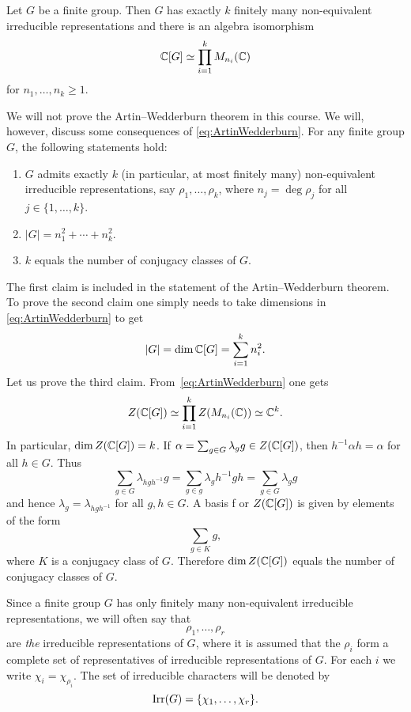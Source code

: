 \begin{theorem}
\label{thm:ArtinWedderburn}
Let $G$ be a finite group. Then $G$ has exactly $k$ finitely
many non-equivalent irreducible representations
and there is an algebra isomorphism 
\begin{equation}
    \label{eq:ArtinWedderburn}
    \mathbb{C}[G]\simeq \prod_{i=1}^k M_{n_i}(\mathbb{C})
\end{equation}
for $n_1,\dots,n_k\geq1$. 
\end{theorem}

We will not prove the Artin--Wedderburn theorem
in this course. We will, however, 
discuss some consequences of \eqref{eq:ArtinWedderburn}. For any finite group $G$, 
the following statements hold: 
\begin{enumerate}
    \item $G$ admits exactly $k$ (in particular, at most finitely many) 
    non-equivalent
    irreducible representations, say $\rho_1,\dots,\rho_k$, where 
    $n_j=\deg\rho_j$ for all $j\in\{1,\dots,k\}$. 
    \item\label{it:|G|} $|G|=n_1^2+\cdots+n_k^2$.
    \item\label{it:conjugacy_classes} $k$ equals the number of conjugacy classes of $G$. 
\end{enumerate}

The first claim is included in the statement of the Artin--Wedderburn theorem. 
To prove the second claim one simply needs to 
take dimensions in \eqref{eq:ArtinWedderburn} to get 
\[
|G|=\dim\mathbb{C}[G]=\sum_{i=1}^k n_i^2.
\]
Let us prove the third claim. From~\eqref{eq:ArtinWedderburn} one gets 
    \[
                Z(\mathbb{C}[G])\simeq\prod_{i=1}^kZ(M_{n_i}(\mathbb{C}))\simeq\mathbb{C}^k.
        \]
        In particular, $\dim Z(\mathbb{C}[G])=k$. If $\alpha=\sum_{g\in
        G}\lambda_gg\in Z(\mathbb{C}[G])$, then $h^{-1}\alpha h=\alpha$ for all $h\in
        G$. Thus
        \[
                \sum_{g\in G}\lambda_{hgh^{-1}}g=
                \sum_{g\in g}\lambda_g h^{-1}gh=\sum_{g\in G}\lambda_gg
        \]
        and hence $\lambda_{g}=\lambda_{hgh^{-1}}$ for all $g,h\in G$. A basis f
or
        $Z(\mathbb{C}[G])$ is given by elements of the form
        \[
                \sum_{g\in K}g,
        \]
        where $K$ is a conjugacy class of $G$. Therefore $\dim Z(\mathbb{C}[G])$ equals
        the number of conjugacy classes of $G$.

\begin{convention}
    Since a finite group $G$ has only finitely many non-equivalent 
irreducible representations, we will often say
that 
\[
\rho_1,\dots,\rho_r
\]
are \emph{the} irreducible representations of $G$, where it is assumed that
the $\rho_i$ form a complete set of 
representatives of irreducible representations of $G$. For each $i$ we write
$\chi_i=\chi_{\rho_i}$. The set of irreducible characters will be denoted
by 
\[
\operatorname{Irr}(G)=\{\chi_1,\dots,\chi_r\}.
\]


\end{convention}

